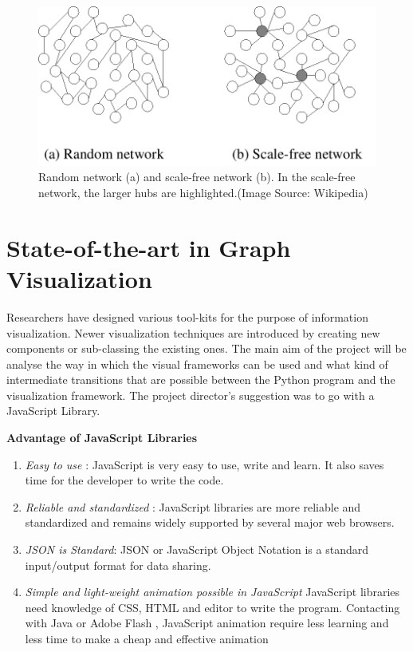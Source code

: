 \begin{figure}[H]
\centering
\includegraphics[scale=0.4]{sclaran.png}
\caption{ \label{ranfig} Random network (a) and scale-free network (b). In the scale-free network, the larger hubs are highlighted.(Image Source: Wikipedia)}
\end{figure}

\section{State-of-the-art in Graph Visualization}
Researchers have designed various tool-kits for the purpose of information visualization. Newer visualization techniques are introduced by creating new components or sub-classing the existing ones. The main aim of the project will be analyse the way in which the visual frameworks can be used and what kind of intermediate transitions that are possible between the Python program and the visualization framework. The project director's suggestion was to go with a JavaScript Library.

\textbf{Advantage of JavaScript Libraries} \cite{graphjslib}
\begin{enumerate}
\item \textit{Easy to use} : JavaScript is very easy to use, write and learn. It also saves time for the developer to write the code.
\item \textit{Reliable and standardized} : JavaScript libraries are more reliable and standardized and remains widely supported by several major web browsers. 
\item \textit{JSON is Standard}: JSON or JavaScript Object Notation is a standard input/output format for data sharing.
\item \textit{Simple and light-weight animation possible in JavaScript} JavaScript libraries need knowledge of CSS, HTML and editor to write the program. Contacting with Java or Adobe Flash , JavaScript animation require less learning and less time to make a cheap and effective animation 
\end{enumerate}

